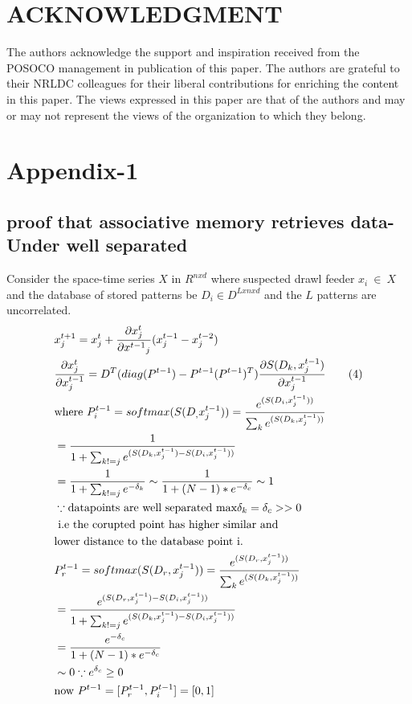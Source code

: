 \documentclass[conference]{IEEEtran}
\begin{document}
\section{ACKNOWLEDGMENT}
The authors acknowledge the support and inspiration received from the POSOCO management in publication of this paper. The authors are grateful to their NRLDC colleagues for their liberal contributions for enriching the content in this paper. The views  expressed in this paper are that of the authors and may or may not represent the views of the organization to which they belong. \\ 
\section*{Appendix-1}
\subsection{proof that associative memory retrieves data- Under well separated }
Consider the space-time series $X$ in $R^{nxd}$ where suspected drawl feeder $x_i \ \in \ X$ and the database of stored patterns be $D_i \in D^{Lxnxd}$ and the $L$ patterns are uncorrelated.
\begin{align*}
& x^{t+1}_j=x^t_j+\frac{\partial x^t_j}{\partial {x^{t-1}}_j}(x^{t-1}_j-x^{t-2}_j) \notag\\
& \frac{\partial x^t_j}{\partial {x^{t-1}_j}}=D^T(diag(P^{t-1})-P^{t-1}(P^{t-1})^T)\frac{\partial S(D_k ,x^{t-1}_j)}{\partial {x^{t-1}_j}} \tag{4} \\
& \text {where } P^{t-1}_i= softmax(S(D_,x^{t-1}_j))= \frac{e^{(S(D_i,{x_j^{t-1}}))}}{\sum_k e^{(S(D_k ,{x_j^{t-1}}))}} \\
&=\frac{1}{1+\sum_{k!=j} e^{(S(D_k ,{x_j^{t-1}})-S(D_i ,{x_j^{t-1}}))}} \\
&=\frac{1}{1+\sum_{k!=j}e^{-\delta_k}} \sim \frac{1}{1+({N-1)}*e^{-\delta_c} } \sim 1\\
&\because \text{datapoints are well separated } \text{max} \delta_k =\delta_c>>0 \\ 
& \text{ i.e  the corupted point has higher similar and} \\
& \text{lower distance to the database point i.} \\
&P^{t-1}_r=softmax(S(D_r,x^{t-1}_j)) =\frac{e^{(S(D_r,{x_j^{t-1}}))}}{\sum_k e^{(S(D_k ,{x_j^{t-1}}))}} \\
&=\frac{e^{(S(D_r ,{x_j^{t-1}})-S(D_i ,{x_j^{t-1}}))}}{1+\sum_{k!=j} e^{(S(D_k ,{x_j^{t-1}})-S(D_i ,{x_j^{t-1}}))}} \\
& = \frac{e^{-\delta_c}}{1+({N-1)}*e^{-\delta_c} }\\
& \sim 0 \because e^{\delta_c} \ge 0 \\
&\text{now } P^{t-1}=[P^{t-1}_r , P^{t-1}_i]=[0, 1] \\
\end{align*}
\end{document}
